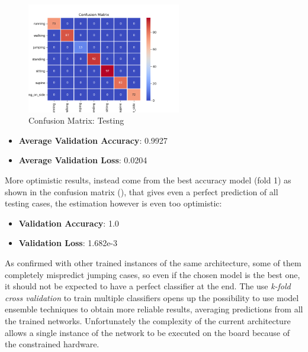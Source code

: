 \begin{figure}
	\hfill\includegraphics[width=0.6\textwidth]{figures/confmat_09-04-2020_221220.png}\hspace*{\fill}
	\caption{Confusion Matrix: Testing}\label{fig:19}
	\centering
	\vspace{-30pt}
\end{figure}
\noindent


\begin{itemize}
	\item \textbf{Average Validation Accuracy}: 0.9927
	\item \textbf{Average Validation Loss}: 0.0204
\end{itemize}
More optimistic results, instead come from the best accuracy model (fold 1) as shown in the confusion matrix (), that gives even a perfect prediction of all testing cases, the estimation however is even too optimistic:
\begin{itemize}
	\item \textbf{Validation Accuracy}: 1.0
	\item \textbf{Validation Loss}: 1.682e-3
\end{itemize} 
As confirmed with other trained instances of the same architecture, some of them completely mispredict jumping cases, so even if the chosen model is the best one, it should not be expected to have a perfect classifier at the end. The use \textit{k-fold cross validation} to train multiple classifiers opens up the possibility to use model ensemble techniques to obtain more reliable results, averaging predictions from all the trained networks. Unfortunately the complexity of the current architecture allows a single instance of the network to be executed on the board because of the constrained hardware.

